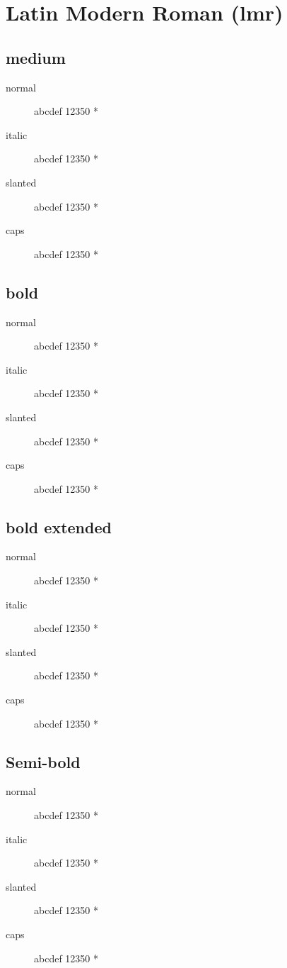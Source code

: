 \section{Latin Modern Roman (lmr)}

\subsection{medium}
\begin{description}
    \item [normal]  abcdef 12350 *
    \item [italic]  abcdef 12350 *
    \item [slanted]  abcdef 12350 *
    \item [caps]  abcdef 12350 *
\end{description}
    
\subsection{bold}
\begin{description}
    \item [normal]  abcdef 12350 *
    \item [italic]  abcdef 12350 *
    \item [slanted]  abcdef 12350 *
    \item [caps]  abcdef 12350 *
\end{description}
    
\subsection{bold extended}
\begin{description}
    \item [normal]  abcdef 12350 *
    \item [italic]  abcdef 12350 *
    \item [slanted]  abcdef 12350 *
    \item [caps]  abcdef 12350 *
\end{description}

\subsection{Semi-bold}
\begin{description}
    \item [normal]  abcdef 12350 *
    \item [italic]  abcdef 12350 *
    \item [slanted]  abcdef 12350 *
    \item [caps]  abcdef 12350 *
\end{description}

